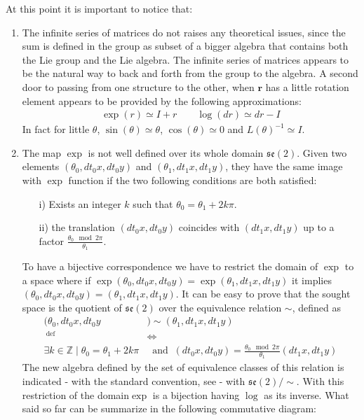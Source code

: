 At this point it is important to notice that: 
\begin{enumerate}
	\item The infinite series of matrices  do not raises any theoretical issues, since the sum is defined in the group as subset of a bigger algebra that contains both the Lie group and the Lie algebra. The infinite series of matrices appears to be the natural way to back and forth from the group to the algebra. A second door to passing from one structure to the other, when $\mathbf{r}$ has a little rotation element appears to be provided by the following approximations:
	\begin{align*}
	\exp(r) \simeq I + r
	\qquad 
	\log(dr) \simeq dr - I
	\end{align*}
	In fact for little $\theta$, $\sin(\theta) \simeq \theta$, $\cos(\theta) \simeq 0 $ and $ L(\theta)^{-1} \simeq I$.
	\item The map $\exp$ is not well defined over its whole domain $\mathfrak{se}(2)$. Given two elements $(\theta_0, dt_0x, dt_0y)$ and $(\theta_1, dt_1x, dt_1y)$, they have the same image with $\exp$ function if the two following conditions are both satisfied:
	\begin{enumerate}
		\item[i)] Exists an integer $k$ such that $\theta_0 = \theta_1 + 2k\pi$.
		\item[ii)] the translation $(dt_0x, dt_0y)$ coincides with $(dt_1x, dt_1y)$ up to a factor $\frac{\theta_0 \mod 2\pi}{\theta_1}$.
	\end{enumerate}
	To have a bijective correspondence we have to restrict the domain of $\exp$ to a space where if $\exp(\theta_0, dt_0x,d t_0y) = \exp(\theta_1, dt_1x, dt_1y)$ it implies  $(\theta_0, dt_0x, dt_0y) = (\theta_1, dt_1x, dt_1y)$.
	It can be easy to prove that the sought space is the quotient of $\mathfrak{se}(2)$ over the equivalence relation $\sim$, defined as 
	\begin{align*}
		(\theta_0, dt_0x, dt_0y & ) \sim (\theta_1, dt_1x, dt_1y)
		\\
		~^{\text{def}}&\iff
		\\
		\exists k\in\mathbb{Z} \mid \theta_0 = \theta_1 + 2k\pi 
		&~\text{ and }~
		(dt_0x, dt_0y) = \frac{\theta_0 \mod 2\pi}{\theta_1}(dt_1x, dt_1y)
	\end{align*}
	The new algebra defined by the set of equivalence classes of this relation is indicated - with the standard convention, see \cite{artin2011algebra} - with $\mathfrak{se}(2)/\sim$. With this restriction of the domain$\exp$ is a bijection having $\log$ as its inverse.
	What said so far can be summarize in the following commutative diagram:
	

\end{enumerate}
